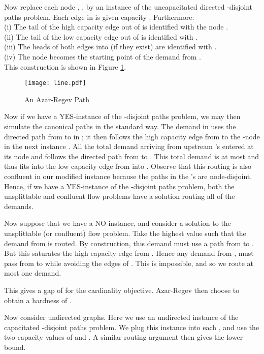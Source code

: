 \documentclass[12pt]{article}
\newcommand{\qed}{}
\begin{document}
Now replace each node , , by an instance  of the uncapacitated directed -disjoint paths problem.
 Each edge in  is given capacity . Furthermore:\\
 (i) The tail of the high capacity edge out of  is identified with the node . \\
 (ii)  The tail of the low capacity edge out of  is identified with .\\
 (iii) The heads of both edges into  (if they exist) are identified with .\\
 (iv) The node  becomes the starting point of the demand  from . \\
This construction is shown in Figure \ref{fig:line}.

\begin{figure}[h]
\begin{center}
\texttt{[image: line.pdf]}\\
\vspace{-6cm}
\caption{\label{fig:line} An Azar-Regev Path}
\end{center}
\end{figure}


Now if we have a YES-instance of the -disjoint paths problem,
we may then simulate the canonical paths in the standard way. The demand in  uses  the directed path
from  to  in ; it then follows the high capacity edge from  to the -node in the
 next instance . All the total demand arriving from upstream 's entered  at its node  and
 follows the directed path from  to . This total demand is at most  and thus fits into the low
 capacity edge from  into .
Observe that this routing is also confluent in our modified instance because the paths in the 's are node-disjoint.
 Hence, if we have a YES-instance
 of the -disjoint paths problem, both the unsplittable and confluent flow problems have a solution routing all of the demands.

 Now suppose that we have a NO-instance, and consider a solution to the unsplittable (or confluent) flow problem.
 Take the highest value  such that
 the demand from  is routed. By construction, this demand must use a path  from  to . But this
 saturates the high capacity edge from . Hence  any demand from ,  must pass from  to  while
 avoiding the edges of . This is impossible, and so we route at most one demand.

 This gives a gap of  for the cardinality objective. Azar-Regev then choose 
to obtain a hardness of .

Now consider undirected graphs. Here we use an
undirected instance of the capacitated -disjoint paths problem.
We plug this instance into each , and use the two capacity values of
 and .
A similar routing argument then gives the lower bound. \qed
\end{document}
